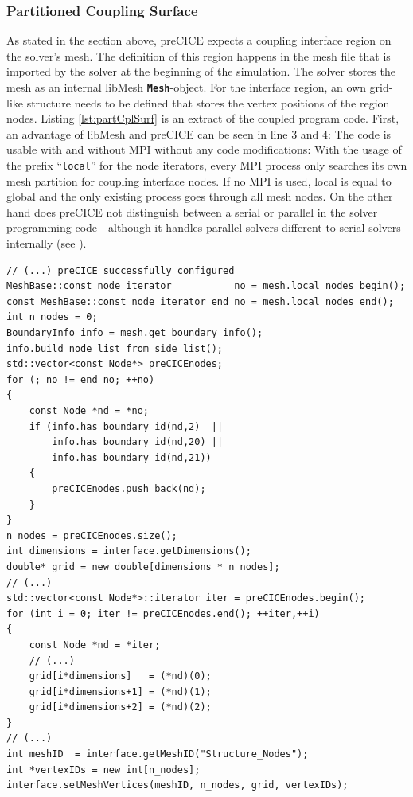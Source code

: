   \subsubsection{Partitioned Coupling Surface}\label{sec:Coupl-Impl-PartCplSurf}
   As stated in the section above, preCICE expects a coupling interface region on the solver's mesh. The definition of this region happens in the mesh file that is imported by the solver at the beginning of the simulation. The solver stores the mesh as an internal libMesh \texttt{\textbf{Mesh}}-object. For the interface region, an own grid-like structure needs to be defined that stores the vertex positions of the region nodes. Listing \ref{lst:partCplSurf} is an extract of the coupled program code. First, an advantage of libMesh and preCICE can be seen in line 3 and 4: The code is usable with and without MPI without any code modifications: With the usage of the prefix ``\texttt{local}'' for the node iterators, every MPI process only searches its own mesh partition for coupling interface nodes. If no MPI is used, local is equal to global and the only existing process goes through all mesh nodes. On the other hand does preCICE not distinguish between a serial or parallel in the solver programming code - although it handles parallel solvers different to serial solvers internally (see \cite{gatzhammer2015efficient}).
   
\begin{lstlisting}[caption=Partition Coupling Surface,label=lst:partCplSurf,keepspaces=true]
// (...) preCICE successfully configured
MeshBase::const_node_iterator           no = mesh.local_nodes_begin();
const MeshBase::const_node_iterator end_no = mesh.local_nodes_end();
int n_nodes = 0;
BoundaryInfo info = mesh.get_boundary_info();
info.build_node_list_from_side_list();
std::vector<const Node*> preCICEnodes;
for (; no != end_no; ++no)
{
	const Node *nd = *no;
   	if (info.has_boundary_id(nd,2)  ||
	    info.has_boundary_id(nd,20) ||
	    info.has_boundary_id(nd,21))
   	{
	   	preCICEnodes.push_back(nd);
   	}
}
n_nodes = preCICEnodes.size();
int dimensions = interface.getDimensions();
double* grid = new double[dimensions * n_nodes];
// (...)
std::vector<const Node*>::iterator iter = preCICEnodes.begin();
for (int i = 0; iter != preCICEnodes.end(); ++iter,++i)
{
	const Node *nd = *iter;
	// (...)
	grid[i*dimensions]   = (*nd)(0);
	grid[i*dimensions+1] = (*nd)(1);
	grid[i*dimensions+2] = (*nd)(2);
}
// (...)
int meshID  = interface.getMeshID("Structure_Nodes");
int *vertexIDs = new int[n_nodes];
interface.setMeshVertices(meshID, n_nodes, grid, vertexIDs);
\end{lstlisting}

